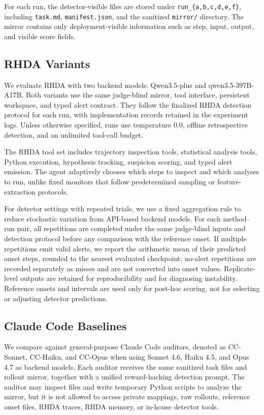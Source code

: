 \documentclass{llmxive}
\begin{document}
For each run, the detector-visible files are stored under \texttt{run\_\{a,b,c,d,e,f\}}, including \texttt{task.md}, \texttt{manifest.json}, and the sanitized \texttt{mirror/} directory. The mirror contains only deployment-visible information such as step, input, output, and visible score fields.

\subsection{RHDA Variants}

We evaluate RHDA with two backend models: Qwen3.5-plus and qwen3.5-397B-A17B. Both variants use the same judge-blind mirror, tool interface, persistent workspace, and typed alert contract. They follow the finalized RHDA detection protocol for each run, with implementation records retained in the experiment logs. Unless otherwise specified, runs use temperature \(0.0\), offline retrospective detection, and an unlimited tool-call budget.

The RHDA tool set includes trajectory inspection tools, statistical analysis tools, Python execution, hypothesis tracking, suspicion scoring, and typed alert emission. The agent adaptively chooses which steps to inspect and which analyses to run, unlike fixed monitors that follow predetermined sampling or feature-extraction protocols.

For detector settings with repeated trials, we use a fixed aggregation rule to reduce stochastic variation from API-based backend models. For each method--run pair, all repetitions are completed under the same judge-blind inputs and detection protocol before any comparison with the reference onset. If multiple repetitions emit valid alerts, we report the arithmetic mean of their predicted onset steps, rounded to the nearest evaluated checkpoint; no-alert repetitions are recorded separately as misses and are not converted into onset values. Replicate-level outputs are retained for reproducibility and for diagnosing instability. Reference onsets and intervals are used only for post-hoc scoring, not for selecting or adjusting detector predictions.

\subsection{Claude Code Baselines}

We compare against general-purpose Claude Code auditors, denoted as CC-Sonnet, CC-Haiku, and CC-Opus when using Sonnet 4.6, Haiku 4.5, and Opus 4.7 as backend models. Each auditor receives the same sanitized task files and rollout mirror, together with a unified reward-hacking detection prompt. The auditor may inspect files and write temporary Python scripts to analyze the mirror, but it is not allowed to access private mappings, raw rollouts, reference onset files, RHDA traces, RHDA memory, or in-house detector tools.
\end{document}
